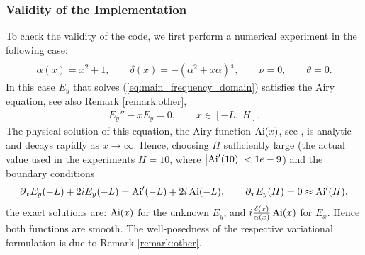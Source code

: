 \subsubsection{Validity of the Implementation}
\label{sec:airy_fd_validity}
To check the validity of the code, we first perform a numerical experiment in the following case:
\begin{align}
\label{eq:parameters}
\alpha(x)=x^2+1,\qquad \delta(x)=-\left(\alpha^2+x\alpha\right)^{\frac{1}{2}}, \qquad \nu=0, \qquad \theta=0.
\end{align}
In this case $E_{y}$ that solves (\ref{eq:main_frequency_domain})  satisfies the Airy equation, see also Remark \ref{remark:other},
\begin{align*}
 E_y''-xE_y=0,\qquad x\in [-L,\; H].
\end{align*}
The physical solution of this equation, the Airy function $\operatorname{Ai}(x)$, see \cite[Chapter 10.4]{abramowitz_stegun}, is analytic and 
decays rapidly as $x\rightarrow \infty$. 
Hence, choosing $H$ sufficiently large (the actual value used in the experiments $H=10$, where $\left|\operatorname{Ai}'(10)\right|<1e-9$) and the boundary conditions
\begin{align}
\label{eq:bcs_airy}
\partial_{x}E_{y}(-L)+2iE_{y}(-L)=\operatorname{Ai}'(-L)+2i\operatorname{Ai}(-L),\qquad 
\partial_{x}E_{y}(H)=0\approx \operatorname{Ai}'(H),
\end{align}
the exact solutions are: $\operatorname{Ai}(x)$ for the unknown $E_{y}$, and $i\frac{\delta(x)}{\alpha(x)}\operatorname{Ai}(x)$ for $E_{x}$. Hence both functions are smooth. 
The well-posedness of the respective variational formulation is due to Remark \ref{remark:other}. 


